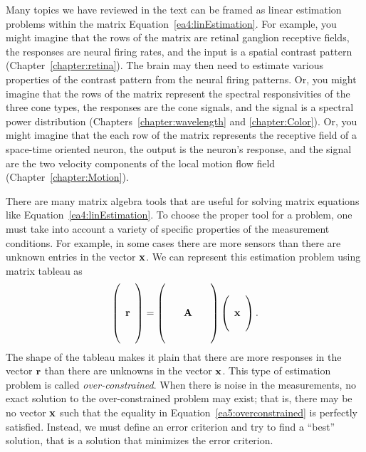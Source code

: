 Many topics we have reviewed in the text can be framed as linear
estimation problems within the matrix
Equation~\ref{ea4:linEstimation}.  For example, you might imagine that
the rows of the matrix are retinal ganglion receptive fields, the
responses are neural firing rates, and the input is a spatial contrast
pattern (Chapter~\ref{chapter:retina}).  The brain may then need to
estimate various properties of the contrast pattern from the neural
firing patterns.  Or, you might imagine that the rows of the matrix
represent the spectral responsivities of the three cone types, the
responses are the cone signals, and the signal is a spectral power
distribution (Chapters~\ref{chapter:wavelength} and
\ref{chapter:Color}).  Or, you might imagine that the each row of the
matrix represents the receptive field of a space-time oriented neuron,
the output is the neuron's response, and the signal are the two
velocity components of the local motion flow field
(Chapter~\ref{chapter:Motion}).

There are many matrix algebra tools that are useful for solving matrix
equations like Equation~\ref{ea4:linEstimation}.  To choose the proper
tool for a problem, one must take into account a variety of specific
properties of the measurement conditions.  For example, in some cases
there are more sensors than there are unknown entries in the vector
$\mbox{${\bf x}$}$.  We can represent this estimation problem using matrix
tableau as
\begin{equation}
\label{ea5:overconstrained}
\left(
 \begin{array}{c}
  ~ \\
  ~ \\
  \mbox{${\bf r}$} \\
  ~ \\
  ~ \\
 \end{array}
\right)
 = 
\left ( 
 \begin{array}{ccc}
  ~& ~ & ~ \\
  ~& ~ & ~ \\
  ~ & \mbox{${\bf A}$} & ~ \\
  ~& ~ & ~ \\
  ~& ~ & ~
 \end{array}
\right )
\left (
 \begin{array}{c}
 ~ \\
 \mbox{${\bf x}$} \\
 ~ \\
 \end{array}
\right ) .
\end{equation}
The shape of the tableau makes it plain that there are more responses
in the vector $\mbox{${\bf r}$}$ than there are unknowns in the vector
$\mbox{${\bf x}$}$.  This type of estimation problem is called {\em
over-constrained}.  When there is noise in the measurements, no exact
solution to the over-constrained problem may exist; that is, there may
be no vector $\mbox{${\bf x}$}$ such that the equality in
Equation~\ref{ea5:overconstrained} is perfectly satisfied.  Instead,
we must define an error criterion and try to find a ``best'' solution,
that is a solution that minimizes the error criterion.

